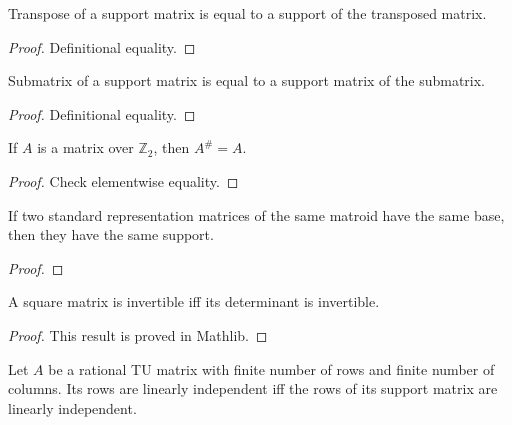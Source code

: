 \begin{lemma}
    \label{Matrix.support_transpose}
    \leanok
    Transpose of a support matrix is equal to a support of the transposed matrix.
\end{lemma}

\begin{proof}
    \leanok
    Definitional equality.
\end{proof}

\begin{lemma}
    \label{Matrix.support_submatrix}
    \leanok
    Submatrix of a support matrix is equal to a support matrix of the submatrix.
\end{lemma}

\begin{proof}
    \leanok
    Definitional equality.
\end{proof}

\begin{lemma}
    \label{Matrix.support_Z2}
    \leanok
    If $A$ is a matrix over $\mathbb{Z}_{2}$, then $A^{\#} = A$.
\end{lemma}

\begin{proof}
    \leanok
    Check elementwise equality.
\end{proof}

\begin{lemma}
    \label{support_eq_support_of_same_matroid_same_X}
    \leanok
    If two standard representation matrices of the same matroid have the same base, then they have the same support.
\end{lemma}

\begin{proof}
    \leanok
    \SeeLean
\end{proof}

\begin{lemma}
    \label{Matrix.isUnit_iff_isUnit_det}
    \leanok
    A square matrix is invertible iff its determinant is invertible.
\end{lemma}

\begin{proof}
    \leanok
    This result is proved in Mathlib.
\end{proof}

\begin{lemma}
    \label{Matrix.IsTotallyUnimodular.linearIndependent_iff_support_linearIndependent_of_finite_of_finite}
    \leanok
    Let $A$ be a rational TU matrix with finite number of rows and finite number of columns.
    Its rows are linearly independent iff the rows of its support matrix are linearly independent.
\end{lemma}

